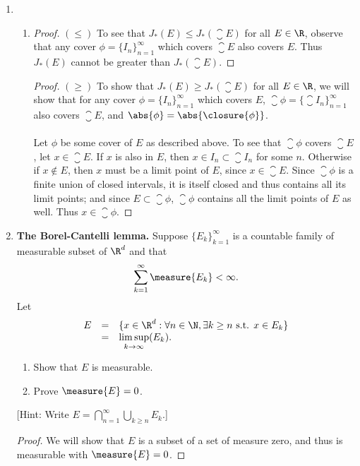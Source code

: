 \documentclass[letterpaper]{article}
\begin{document}
\begin{enumerate}
	\item \mbox{}
		\begin{enumerate}
		\item
		\begin{proof}
		$(\leq)$ To see that $J_*(E)\leq J_*(\closure{E})$ for all $E\in\R$, observe that any cover $\phi=\{I_n\}_{n=1}^\infty$ which covers $\closure{E}$ also covers $E$. Thus $J_*(E)$ cannot be greater than $J_*(\closure{E})$.
		\end{proof}
		\begin{proof}
		$(\geq)$ To show that $J_*(E)\geq J_*(\closure{E})$ for all $E\in\R$, we will show that for any cover $\phi=\{I_n\}_{n=1}^\infty$ which covers $E$, $\closure{\phi}=\{\closure{I_n}\}_{n=1}^\infty$ also covers $\closure{E}$, and $\abs{\phi}=\abs{\closure{\phi}}$. \\
		\mbox{}\\
		Let $\phi$ be some cover of $E$ as described above. To see that $\closure{\phi}$ covers $\closure{E}$, let $x\in\closure{E}$. If $x$ is also in $E$, then $x\in I_n \subset \closure{I_n}$ for some $n$. Otherwise if $x\not\in E$, then $x$ must be a limit point of $E$, since $x\in\closure{E}$. Since $\closure{\phi}$ is a finite union of closed intervals, it is itself closed and thus contains all its limit points; and since $E\subset\closure{\phi}$, $\closure{\phi}$ contains all the limit points of $E$ as well. Thus $x\in\closure{\phi}$.
		\end{proof}
		\end{enumerate}

\setcounter{enumi}{15}
\item \textbf{The Borel-Cantelli lemma.} Suppose $\{E_k\}_{k=1}^\infty$ is a countable family of measurable subset of $\R^d$ and that
$$\sum_{k=1}^\infty \measure{E_k}<\infty.$$
Let
\[\begin{array}{rcl}
E &=& \{x\in\R^d: \forall n\in \N, \exists k\geq n \text{ s.t. } x \in E_k\}\\
&=& \limsup\limits_{k\to\infty}(E_k).
\end{array}\]
	\begin{enumerate}
	\item Show that $E$ is measurable.
	\item Prove $\measure{E}=0$.
	\end{enumerate}
[Hint: Write $E=\bigcap_{n=1}^\infty \bigcup_{k\geq n} E_k.$]
\begin{proof}
We will show that $E$ is a subset of a set of measure zero, and thus is measurable with $\measure{E}=0$.


\end{proof}
\end{enumerate}
\end{document}
